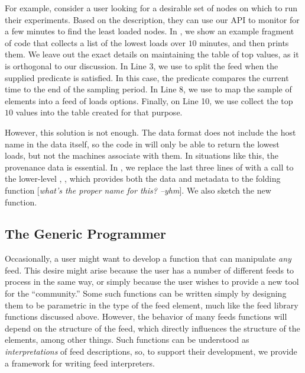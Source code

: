 For example, consider a \planetlab user looking for a desirable set of nodes on which to run their experiments. Based on the \comon description, they can use our API to monitor \planetlab for a few minutes to find the least loaded nodes. In , we show an example fragment of \ocaml code that collects a list of the lowest loads over $10$ minutes, and then prints them. We leave out the exact details on maintaining the table of top values, as it is orthogonal to our 
discussion. In Line 3, we use  to split the feed when the supplied predicate is satisfied. In this case, the predicate compares the current time to the end of the sampling period. In Line 8, we use  to map the sample of \comon elements into a feed of loads options. Finally, on Line 10, we use  collect the top $10$ values into the table created for that purpose.

However, this solution is not enough. The \comon data format does not include the host name in the data itself, so the code in  will only be able to return the lowest loads, but not the machines associate with them. In situations like this, the provenance data is essential.  In , we  replace the last three lines of  with a call to the lower-level , , which provides both the data and metadata to the folding function [{\it what's the proper name for this? --yhm}]. We also sketch the new  function.


\subsection{The Generic Programmer}


Occasionally, a user might want to develop a function that can manipulate {\it any} feed. This desire might arise because the user has a number of different feeds to process in the same way, or simply because the user wishes to provide a new tool for the \padsd{} ``community.'' Some such functions can be written simply by designing them to be parametric in the type of the feed element, much like the feed library functions discussed above. However, the behavior of many feeds functions will depend on the structure of the feed, which directly influences the structure of the elements, among other things. Such functions can be understood as {\it interpretations} of feed descriptions, so, to support their development, we provide a framework for writing feed interpreters.


